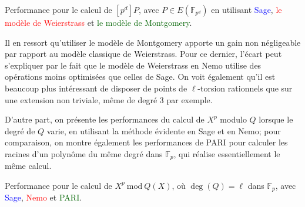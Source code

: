 \documentclass[11pt,a4paper]{article}
\newcommand{\F}{\mathbb{F}}
\renewcommand{\mod}{\ \mathrm{mod}\ }
\renewcommand{\v}{\vspace{5mm}}
\theoremstyle{definition}
\begin{document}
\begin{center}

\small Performance pour le calcul de $[p^d] P$, avec $P \in E(\F_{p^d})$ en utilisant  \textcolor{blue}{Sage},
\textcolor{red}{le modèle de Weierstrass} et
\textcolor{darkgreen}{le modèle de Montgomery}.

\end{center}

Il en ressort qu'utiliser le modèle de Montgomery apporte un gain non négligeable par rapport au modèle classique de Weierstrass. Pour ce dernier, l'écart peut s'expliquer par le fait que le modèle de Weierstrass en Nemo utilise des opérations moins optimisées que celles de Sage. On voit également qu'il est beaucoup plus intéressant de disposer de points de $\ell$-torsion rationnels que sur une extension non triviale, même de degré 3 par exemple.

\v
D'autre part, on présente les performances du calcul de $X^p$ modulo $Q$ lorsque le degré de $Q$ varie, en utilisant la méthode évidente en Sage et en Nemo; pour comparaison, on montre également les performances de PARI pour calculer les racines d'un polynôme du même degré dans $\F_p$, qui réalise essentiellement le même calcul.

\begin{center}

\small{Performance pour le calcul de $X^p \mod{Q(X)}$, où $\deg(Q) = \ell$ dans $\F_p$, avec 
\textcolor{blue}{Sage},
\textcolor{red}{Nemo} et 
\textcolor{darkgreen}{PARI}.}

\end{center}
\end{document}
